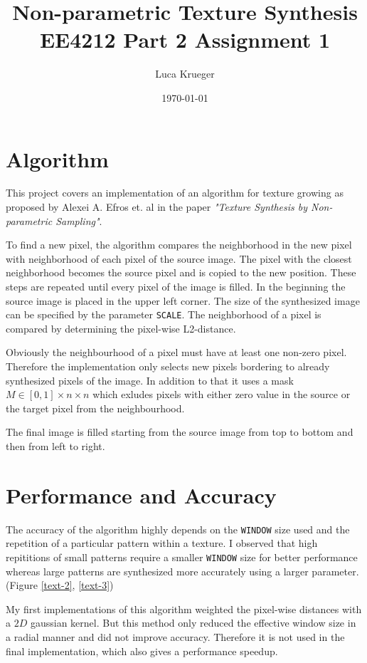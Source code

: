 \documentclass{article}
\title{Non-parametric Texture Synthesis \\ EE4212 Part 2 Assignment 1}
\author{Luca Krueger}
\date{\today}
\begin{document}
\maketitle

\section{Algorithm}
This project covers an implementation of an algorithm for texture growing as proposed by Alexei A. Efros et. al in the paper \textit{"Texture Synthesis by Non-parametric Sampling"}\cite{Efros}.

To find a new pixel, the algorithm compares the neighborhood in the new pixel with neighborhood of each pixel of the source image. The pixel with the closest neighborhood becomes the source pixel and is copied to the new position. These steps are repeated until every pixel of the image is filled.
In the beginning the source image is placed in the upper left corner. The size of the synthesized image can be specified by the parameter \texttt{SCALE}.
The neighborhood of a pixel is compared by determining the pixel-wise L2-distance. 

Obviously the neighbourhood of a pixel must have at least one non-zero pixel. Therefore the implementation only selects new pixels bordering to already synthesized pixels of the image. In addition to that it uses a mask $M\in [0,1]\times n \times n$ which exludes pixels with either zero value in the source or the target pixel from the neighbourhood.

The final image is filled starting from the source image from top to bottom and then from left to right.

\section{Performance and Accuracy}
The accuracy of the algorithm highly depends on the \texttt{WINDOW} size used and the repetition of a particular pattern within a texture. 
I observed that high repititions of small patterns require a smaller \texttt{WINDOW} size for better performance whereas large patterns are synthesized more accurately using a larger parameter. (Figure \ref{text-2}, \ref{text-3})


My first implementations of this algorithm weighted the pixel-wise distances with a $2D$ gaussian kernel. But this method only reduced the effective window size in a radial manner and did not improve accuracy. Therefore it is not used in the final implementation, which also gives a performance speedup.
\end{document}
